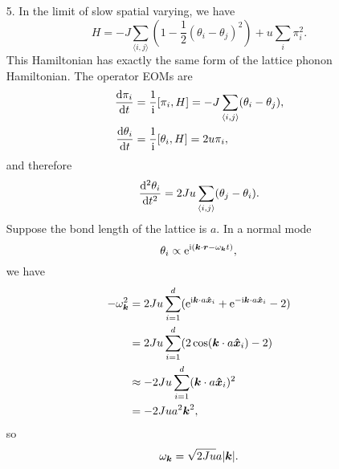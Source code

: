 \documentclass[hyperref, a4paper]{article}
\newcommand*{\ii}{\mathrm{i}}
\newcommand*{\ee}{\mathrm{e}}
\newcommand*{\pair}[1]{\langle #1 \rangle}
\begin{document}
\begin{itemize}
\item[5.] In the limit of slow spatial varying,
we have 
\begin{equation}
    H = -J \sum_{\pair{i, j}} \left(1 - \frac{1}{2} (\theta_i - \theta_j)^2 \right) + u \sum_i \pi_i^2. 
\end{equation}
This Hamiltonian has exactly the same form of the lattice phonon Hamiltonian.
The operator EOMs are 
\begin{equation}
    \begin{aligned}
        \dv{\pi_i}{t} &= \frac{1}{\ii} \comm{\pi_i}{H} = 
        - J \sum_{\pair{i, j}} (\theta_i - \theta_j) , \\
        \dv{\theta_i}{t} &= \frac{1}{\ii} \comm{\theta_i}{H} = 2 u \pi_i,
    \end{aligned}
\end{equation}
and therefore 
\begin{equation}
    \dv[2]{\theta_i}{t} = 2 J u \sum_{\pair{i, j}} (\theta_j - \theta_i).
\end{equation}
Suppose the bond length of the lattice is $a$.
In a normal mode
\begin{equation}
    \theta_i \propto \ee^{\ii (\vb*{k} \cdot \vb*{r} - \omega_{\vb*{k}} t)},
\end{equation}
we have 
\[
    \begin{aligned}
        - \omega_{\vb*{k}}^2 &= 2 Ju \sum_{i=1}^d (
            \ee^{\ii \vb*{k} \cdot a \vu*{x}_i} + \ee^{- \ii \vb*{k} \cdot a \vu*{x}_i} - 2
        ) \\
        &= 2 J u\sum_{i=1}^d (2 \cos (\vb*{k} \cdot a \vu*{x}_i) - 2) \\
        &\approx - 2 J u \sum_{i=1}^d (\vb*{k} \cdot a \vu*{x}_i)^2 \\
        &= - 2 J u a^2 \vb*{k}^2,
    \end{aligned}
\]
so
\begin{equation}
    \omega_{\vb*{k}} = \sqrt{2 J u} a \abs{\vb*{k}}.
\end{equation}


\end{itemize}
\end{document}
